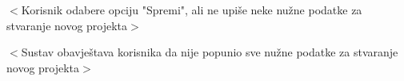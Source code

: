 \begin{packed_item}
\begin{packed_item}
\begin{packed_enum}
							\end{packed_enum}

							\item[7.b] $<$Korisnik odabere opciju "Spremi", ali ne upiše neke nužne podatke za 
							stvaranje novog projekta$>$
							\item[] \begin{packed_enum}

								\item $<$Sustav obavještava korisnika da nije popunio sve nužne podatke za 
								stvaranje novog projekta$>$

							\end{packed_enum}

						\end{packed_item}
					\end{packed_item}

